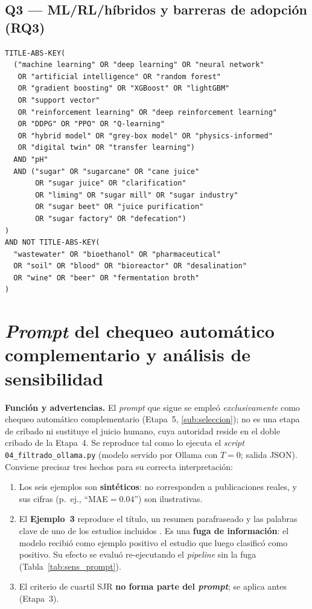 \subsection*{Q3 --- ML/RL/híbridos y barreras de adopción (RQ3)}

\begin{lstlisting}[language={},caption={Cadena Q3 (Scopus).},label={lst:q3}]
TITLE-ABS-KEY(
  ("machine learning" OR "deep learning" OR "neural network"
   OR "artificial intelligence" OR "random forest"
   OR "gradient boosting" OR "XGBoost" OR "lightGBM"
   OR "support vector"
   OR "reinforcement learning" OR "deep reinforcement learning"
   OR "DDPG" OR "PPO" OR "Q-learning"
   OR "hybrid model" OR "grey-box model" OR "physics-informed"
   OR "digital twin" OR "transfer learning")
  AND "pH"
  AND ("sugar" OR "sugarcane" OR "cane juice"
       OR "sugar juice" OR "clarification"
       OR "liming" OR "sugar mill" OR "sugar industry"
       OR "sugar beet" OR "juice purification"
       OR "sugar factory" OR "defecation")
)
AND NOT TITLE-ABS-KEY(
  "wastewater" OR "bioethanol" OR "pharmaceutical"
  OR "soil" OR "blood" OR "bioreactor" OR "desalination"
  OR "wine" OR "beer" OR "fermentation broth"
)
\end{lstlisting}

\section{\textit{Prompt} del chequeo automático complementario y análisis de
sensibilidad}
\label{apx:prompt}

\noindent\textbf{Función y advertencias.} El \textit{prompt} que sigue se
empleó \emph{exclusivamente} como chequeo automático complementario
(Etapa~5, \ref{sub:seleccion}); no es una etapa de cribado ni sustituye el
juicio humano, cuya autoridad reside en el doble cribado de la Etapa~4. Se
reproduce tal como lo ejecuta el \textit{script} \texttt{04\_filtrado\_ollama.py}
(modelo servido por Ollama con $T=0$; salida JSON). Conviene precisar tres
hechos para su correcta interpretación:
\begin{enumerate}[leftmargin=*,noitemsep]
\item Los seis ejemplos son \textbf{sintéticos}: no corresponden a
publicaciones reales, y sus cifras (p.~ej., ``MAE$=0.04$'') son
ilustrativas.
\item El \textbf{Ejemplo~3} reproduce el título, un resumen parafraseado y
las palabras clave de uno de los estudios incluidos
\parencite{palaciomorales2021optimiza}. Es una \textbf{fuga de información}:
el modelo recibió como ejemplo positivo el estudio que luego clasificó
como positivo. Su efecto se evaluó re-ejecutando el \textit{pipeline} sin
la fuga (Tabla~\ref{tab:sens_prompt}).
\item El criterio de cuartil SJR \textbf{no forma parte del
\textit{prompt}}; se aplica antes (Etapa~3).
\end{enumerate}

